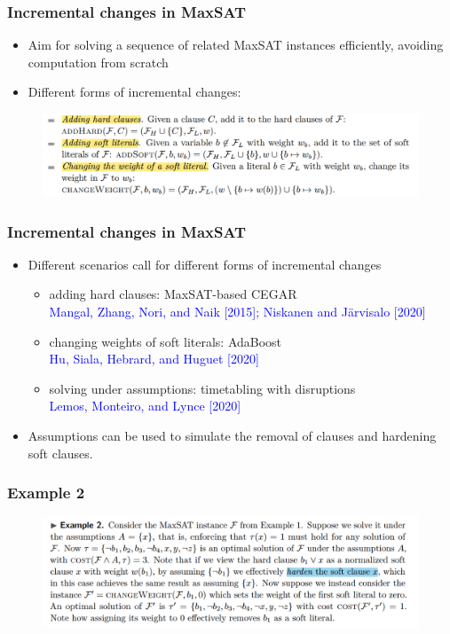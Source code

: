 \documentclass[aspectratio=169 %
,serif,mathserif]{beamer}
\begin{document}
\begin{frame}
	\frametitle{Incremental changes in MaxSAT}
	\begin{itemize}
		\item Aim for solving a sequence of related MaxSAT instances efficiently, avoiding computation from scratch
		\item Different forms of incremental changes:		
	\end{itemize}
	\begin{figure}[htbp]
		\includegraphics[width=1\linewidth]{2.png}
	\end{figure}
\end{frame}

\begin{frame}
	\frametitle{Incremental changes in MaxSAT}
	\begin{itemize}
		\item Different scenarios call for different forms of incremental changes
		\begin{itemize}
			\item adding hard clauses: MaxSAT-based CEGAR \\
			\qquad\textcolor{blue}{Mangal, Zhang, Nori, and Naik [2015]; Niskanen and Järvisalo [2020]}
			\item changing weights of soft literals: AdaBoost \\
			\qquad\textcolor{blue}{Hu, Siala, Hebrard, and Huguet [2020]}
			\item solving under assumptions: timetabling with disruptions \\
			\qquad\textcolor{blue}{Lemos, Monteiro, and Lynce [2020]}
		\end{itemize}
		\item Assumptions can be used to simulate the removal of clauses and hardening soft clauses.	
	\end{itemize}
\end{frame}

\begin{frame}
	\frametitle{Example 2}
	\begin{figure}[htbp]
		\includegraphics[width=1\linewidth]{3.png}
	\end{figure}
\end{frame}
\end{document}
